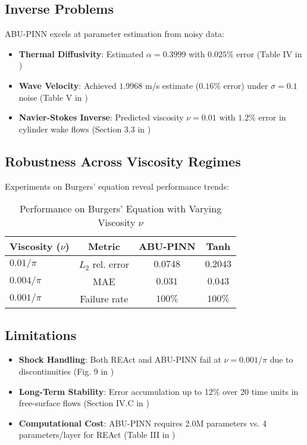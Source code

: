 \subsection*{Inverse Problems}
ABU-PINN excels at parameter estimation from noisy data:
\begin{itemize}
    \item \textbf{Thermal Diffusivity}: Estimated $\alpha=0.3999$ with $0.025\%$ error (Table IV in \cite{abu_pinn})
    \item \textbf{Wave Velocity}: Achieved $1.9968$ m/s estimate ($0.16\%$ error) under $\sigma=0.1$ noise (Table V in \cite{react})
    \item \textbf{Navier-Stokes Inverse}: Predicted viscosity $\nu=0.01$ with $1.2\%$ error in cylinder wake flows (Section 3.3 in \cite{abu_pinn})
\end{itemize}

\subsection*{Robustness Across Viscosity Regimes}
Experiments on Burgers' equation reveal performance trends:
\begin{table}[h]
\centering
\caption{Performance on Burgers' Equation with Varying Viscosity $\nu$}
\begin{tabular}{l|c|c|c}
\textbf{Viscosity ($\nu$)} & \textbf{Metric} & \textbf{ABU-PINN} & \textbf{Tanh} \\
\hline
$0.01/\pi$ & $L_2$ rel. error & $0.0748$ & $0.2043$ \\
$0.004/\pi$ & MAE & $0.031$ & $0.043$ \\
$0.001/\pi$ & Failure rate & $100\%$ & $100\%$ \\
\end{tabular}
\end{table}

\subsection*{Limitations}
\begin{itemize}
    \item \textbf{Shock Handling}: Both REAct and ABU-PINN fail at $\nu=0.001/\pi$ due to discontinuities (Fig. 9 in \cite{abu_pinn})
    \item \textbf{Long-Term Stability}: Error accumulation up to 12\% over 20 time units in free-surface flows (Section IV.C in \cite{free_surface})
    \item \textbf{Computational Cost}: ABU-PINN requires 2.0M parameters vs. 4 parameters/layer for REAct (Table III in \cite{abu_pinn})
\end{itemize}


